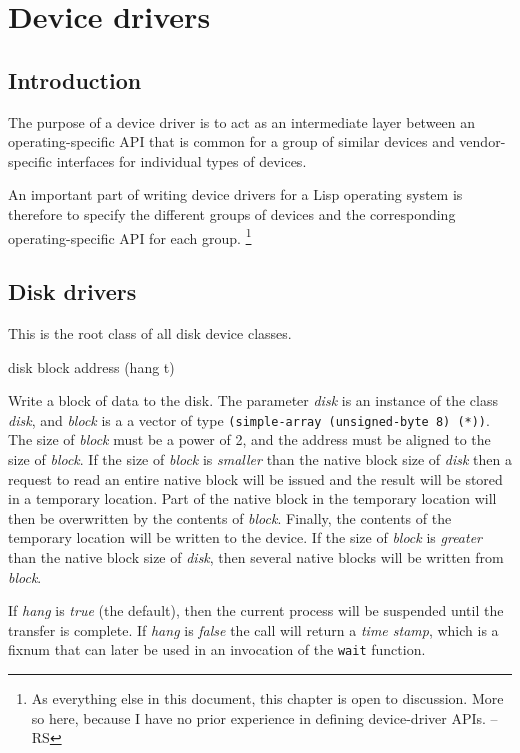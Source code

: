 \chapter{Device drivers}

\section{Introduction}

The purpose of a device driver is to act as an intermediate layer
between an operating-specific API that is common for a group of
similar devices and vendor-specific interfaces for individual types of
devices. 

An important part of writing device drivers for a Lisp operating
system is therefore to specify the different groups of devices and the
corresponding operating-specific API for each group.%
\footnote{As everything else in this document, this chapter is open to
  discussion.  More so here, because I have no prior experience in
  defining device-driver APIs. -- RS}

\section{Disk drivers}


This is the root class of all disk device classes.  


 {disk block address \key (hang t)}

Write a block of data to the disk.  The parameter \textit{disk} is an
instance of the class \textit{disk}, and \textit{block} is a a vector
of type \texttt{(simple-array (unsigned-byte 8) (*))}.  The size of
\textit{block} must be a power of 2, and the address must be aligned
to the size of \textit{block}.  If the size of \textit{block} is
\emph{smaller} than the native block size of \textit{disk} then a
request to read an entire native block will be issued and the result
will be stored in a temporary location.  Part of the native block in
the temporary location will then be overwritten by the contents of
\textit{block}.  Finally, the contents of the temporary location will
be written to the device.  If the size of \textit{block} is
\emph{greater} than the native block size of \textit{disk}, then
several native blocks will be written from \textit{block}.

If \textit{hang} is \emph{true} (the default), then the current
process will be suspended until the transfer is complete.
If \textit{hang} is \emph{false} the call will return a \emph{time
  stamp}, which is a fixnum that can later be used in an invocation of
the \texttt{wait} function.

